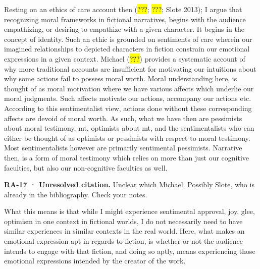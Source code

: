 \documentclass[
  letterpaper,
  DIV=11,
  numbers=noendperiod]{scrartcl}
\theoremstyle{remark}
\begin{document}
Resting on an ethics of care account then (\hl{???}; \hl{???}; Slote
2013); I argue that recognizing moral frameworks in fictional
narratives, begins with the audience empathizing, or desiring to
empathize with a given character. It begins in the concept of identity.
Such an ethic is grounded on sentiments of care wherein our imagined
relationships to depicted characters in fiction constrain our emotional
expressions in a given context. Michael (\hl{???}) provides a systematic
account of why more traditional accounts are insufficient for motivating
our intuitions about why some actions fail to possess moral worth. Moral
understanding here, is thought of as moral motivation where we have
various affects which underlie our moral judgments. Such affects
motivate our actions, accompany our actions etc. According to this
sentimentalist view, actions done without these corresponding affects
are devoid of moral worth. As such, what we have then are pessimists
about moral testimony, mt, optimists about mt, and the sentimentalists
who can either be thought of as optimists or pessimists with respect to
moral testimony. Most sentimentalists however are primarily sentimental
pessimists. Narrative then, is a form of moral testimony which relies on
more than just our cognitive faculties, but also our non-cognitive
faculties as well.

\begin{tcolorbox}[enhanced jigsaw, arc=.35mm, bottomrule=.15mm, bottomtitle=1mm, breakable, colback=white, colbacktitle=quarto-callout-warning-color!10!white, colframe=quarto-callout-warning-color-frame, coltitle=black, left=2mm, leftrule=.75mm, opacityback=0, opacitybacktitle=0.6, rightrule=.15mm, title=\textcolor{quarto-callout-warning-color}{\faExclamationTriangle}\hspace{0.5em}{Warning}, titlerule=0mm, toprule=.15mm, toptitle=1mm]

\textbf{RA-17 · Unresolved citation.} Unclear which Michael. Possibly
Slote, who is already in the bibliography. Check your notes.

\end{tcolorbox}

What this means is that while I might experience sentimental approval,
joy, glee, optimism in one context in fictional worlds, I do not
necessarily need to have similar experiences in similar contexts in the
real world. Here, what makes an emotional expression apt in regards to
fiction, is whether or not the audience intends to engage with that
fiction, and doing so aptly, means experiencing those emotional
expressions intended by the creator of the work.
\end{document}
